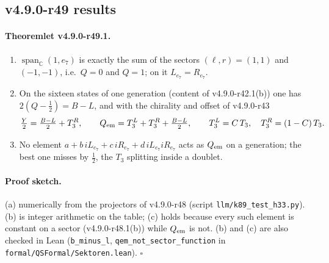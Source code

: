 \subsection*{v4.9.0-r49 results}
\label{subsec:v490-r49-results}

\paragraph{Theoremlet v4.9.0-r49.1.}
\begin{enumerate}[leftmargin=2em]
\item[(a)] \(\operatorname{span}_{\mathbb C}(1,e_7)\) is exactly the sum of the sectors \((\ell,r)=(1,1)\) and \((-1,-1)\), i.e.\ \(Q=0\) and
\(Q=1\); on it \(L_{e_7}=R_{e_7}\).
\item[(b)] On the sixteen states of one generation (content of v4.9.0-r42.1(b)) one has \(2(Q-\tfrac12)=B-L\), and with the chirality and
offset of v4.9.0-r43
\[
\tfrac{Y}{2}=\tfrac{B-L}{2}+T_3^R,\qquad Q_{\rm em}=T_3^L+T_3^R+\tfrac{B-L}{2},\qquad T_3^L=C\,T_3,\quad T_3^R=(1-C)\,T_3 .
\]
\item[(c)] No element \(a+b\,iL_{e_7}+c\,iR_{e_7}+d\,iL_{e_7}iR_{e_7}\) acts as \(Q_{\rm em}\) on a generation; the best one misses by
\(\tfrac12\), the \(T_3\) splitting inside a doublet.
\end{enumerate}

\paragraph{Proof sketch.}
(a) numerically from the projectors of v4.9.0-r48 (script \texttt{llm/k89\_test\_h33.py}).  (b) is integer arithmetic on the table; (c)
holds because every such element is constant on a sector (v4.9.0-r48.1(b)) while \(Q_{\rm em}\) is not.  (b) and (c) are also checked in
Lean (\texttt{b\_minus\_l}, \texttt{qem\_not\_sector\_function} in \texttt{formal/QSFormal/Sektoren.lean}).  \(\square\)

